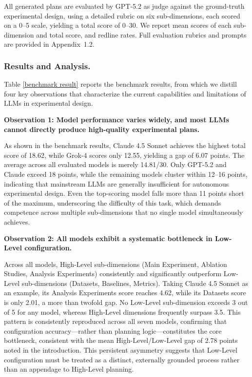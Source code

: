 \documentclass[letterpaper]{article} %
\begin{document}
All generated plans are evaluated by GPT-5.2 as judge against the ground-truth experimental design, using a detailed rubric on six sub-dimensions, 
each scored on a 0--5 scale, yielding a total score of 0--30. We report mean scores of each sub-dimension and total score, and redline rates. Full evaluation rubrics and prompts are provided in Appendix~1.2.
 

\subsubsection{Results and Analysis.}
Table \ref{benchmark result} reports the benchmark results, from which we distill four key observations that characterize 
the current capabilities and limitations of LLMs in experimental design.

\textbf{Observation 1: Model performance varies widely, and most LLMs cannot directly produce high-quality experimental plans.} 

As shown in the benchmark results, Claude 4.5 Sonnet achieves the highest total score of 18.62, while 
Grok-4 scores only 12.55, yielding a gap of 6.07 points. The average across all evaluated models is merely 
14.81/30. Only GPT-5.2 and Claude exceed 18 points, while the remaining models cluster within 12--16 points, 
indicating that mainstream LLMs are generally insufficient for autonomous experimental design. 
Even the top-scoring model falls more than 11 points short of the maximum, underscoring the difficulty of
this task, which demands competence across multiple sub-dimensions that no single model simultaneously achieves.

\textbf{Observation 2: All models exhibit a systematic bottleneck in Low-Level configuration.} 

Across all models, High-Level sub-dimensions (Main Experiment, Ablation Studies, Analysis Experiments) 
consistently and significantly outperform Low-Level sub-dimensions (Datasets, Baselines, Metrics). 
Taking Claude 4.5 Sonnet as an example, its Analysis Experiments score reaches 4.62, while its Datasets score is only 
2.01, a more than twofold gap. No Low-Level sub-dimension exceeds 3 out of 5 for any model, whereas 
High-Level dimensions frequently surpass 3.5. This pattern is consistently reproduced across all seven 
models, confirming that configuration accuracy---rather than planning logic---constitutes the core 
bottleneck, consistent with the mean High-Level/Low-Level gap of 2.78 points noted in the introduction. This persistent asymmetry suggests that Low-Level configuration must be treated as a distinct, externally grounded process rather than an appendage to High-Level planning.
\end{document}

